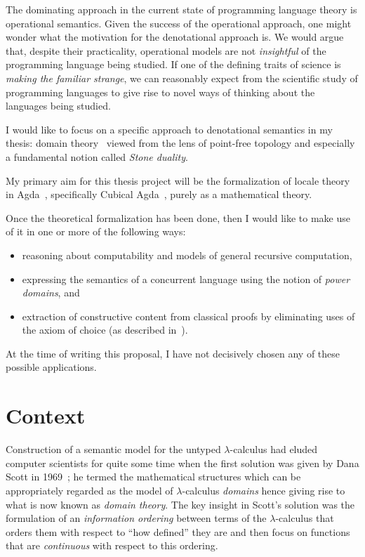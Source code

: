 \documentclass{article}
\begin{document}
The dominating approach in the current state of programming language theory is operational
semantics. Given the success of the operational approach, one might wonder what the
motivation for the denotational approach is. We would argue that, despite their
practicality, operational models are not \emph{insightful} of the programming language
being studied. If one of the defining traits of science is \emph{making the familiar
strange}, we can reasonably expect from the scientific study of programming languages to
give rise to novel ways of thinking about the languages being studied.

I would like to focus on a specific approach to denotational semantics in my thesis:
domain theory~\cite{scott:1969} viewed from the lens of point-free topology and especially
a fundamental notion called \emph{Stone duality}.

My primary aim for this thesis project will be the formalization of locale theory in
Agda~\cite{norell:2008}, specifically Cubical Agda~\cite{cubicalagda}, purely as a
mathematical theory.

Once the theoretical formalization has been done, then I would like to make use of it in
one or more of the following ways:
\begin{itemize}
  \item reasoning about computability and models of general recursive computation,
  \item expressing the semantics of a concurrent language using the notion of
    \emph{power domains}, and
  \item extraction of constructive content from classical proofs by eliminating uses of
    the axiom of choice (as described in~\cite{coquand:1997}).
\end{itemize}
At the time of writing this proposal, I have not decisively chosen any of these possible
applications.

\section{Context}

Construction of a semantic model for the untyped $\lambda$-calculus had eluded computer
scientists for quite some time when the first solution was given by Dana Scott in
1969~\cite{scott:1969}; he termed the mathematical structures which can be appropriately
regarded as the model of $\lambda$-calculus \emph{domains} hence giving rise to what is now
known as \emph{domain theory}. The key insight in Scott's solution was the formulation of
an \emph{information ordering} between terms of the $\lambda$-calculus that orders them with
respect to ``how defined'' they are and then focus on functions that are \emph{continuous}
with respect to this ordering.
\end{document}
